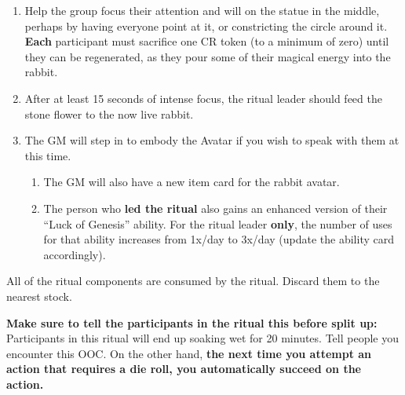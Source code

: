 \documentclass[green]{GL2020}
\begin{document}
\begin{enumerate}
  \item Help the group focus their attention and will on the statue in the middle, perhaps by having everyone point at it, or constricting the circle around it. \textbf{Each} participant must sacrifice one CR token (to a minimum of zero) until they can be regenerated, as they pour some of their magical energy into the rabbit.
  \item After at least 15 seconds of intense focus, the ritual leader should feed the stone flower to the now live rabbit.
  \item The GM will step in to embody the Avatar if you wish to speak with them at this time.
    \begin{enumerate}
      \item The GM will also have a new item card for the rabbit avatar.
      \item The person who \textbf{led the ritual} also gains an enhanced version of their “Luck of Genesis” ability. For the ritual leader \textbf{only}, the number of uses for that ability increases from 1x/day to 3x/day (update the ability card accordingly).
    \end{enumerate}
\end{enumerate}

All of the ritual components are consumed by the ritual. Discard them to the nearest stock.

\textbf{Make sure to tell the participants in the ritual this before split up:} Participants in this ritual will end up soaking wet for 20 minutes. Tell people you encounter this OOC. On the other hand, \textbf{the next time you attempt an action that requires a die roll, you automatically succeed on the action.}
\end{document}

